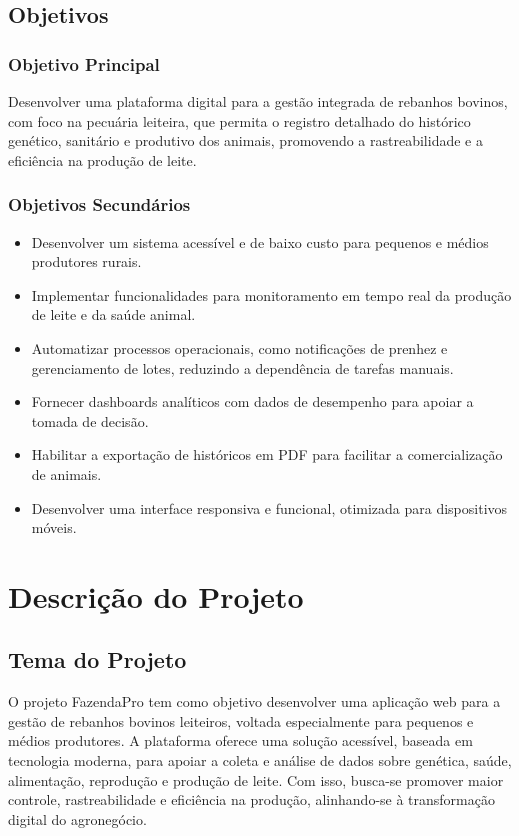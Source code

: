\documentclass[12pt, a4paper]{article}
\begin{document}
\subsection{Objetivos}
\begin{spacing}{1.5}
\subsubsection{Objetivo Principal}
Desenvolver uma plataforma digital para a gestão integrada de rebanhos bovinos, com foco na pecuária leiteira, que permita o registro detalhado do histórico genético, sanitário e produtivo dos animais, promovendo a rastreabilidade e a eficiência na produção de leite.

\subsubsection{Objetivos Secundários}
\begin{itemize}
    \item Desenvolver um sistema acessível e de baixo custo para pequenos e médios produtores rurais.
    \item Implementar funcionalidades para monitoramento em tempo real da produção de leite e da saúde animal.
    \item Automatizar processos operacionais, como notificações de prenhez e gerenciamento de lotes, reduzindo a dependência de tarefas manuais.
    \item Fornecer dashboards analíticos com dados de desempenho para apoiar a tomada de decisão.
    \item Habilitar a exportação de históricos em PDF para facilitar a comercialização de animais.
    \item Desenvolver uma interface responsiva e funcional, otimizada para dispositivos móveis.
\end{itemize}
\end{spacing}

\section{Descrição do Projeto}

\subsection{Tema do Projeto}

\begin{spacing}{1.5}
O projeto FazendaPro tem como objetivo desenvolver uma aplicação web para a gestão de rebanhos bovinos leiteiros, voltada especialmente para pequenos e médios produtores. A plataforma oferece uma solução acessível, baseada em tecnologia moderna, para apoiar a coleta e análise de dados sobre genética, saúde, alimentação, reprodução e produção de leite. Com isso, busca-se promover maior controle, rastreabilidade e eficiência na produção, alinhando-se à transformação digital do agronegócio.
\end{spacing}
\end{document}
